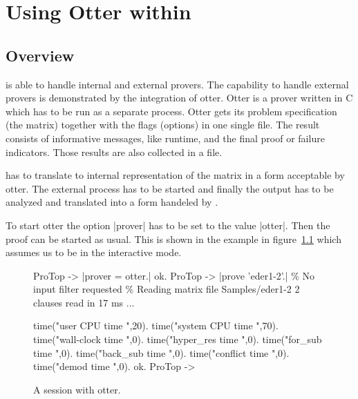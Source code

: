 
\chapter{Using Otter within \ProTop}


\section{Overview}

\ProTop{} is able to handle internal and external provers. The capability to
handle external provers is demonstrated by the integration of otter. Otter is
a prover written in C which has to be run as a separate process. Otter gets
its problem specification (the matrix) together with the flags (options) in
one single file. The result consists of informative messages, like runtime,
and the final proof or failure indicators. Those results are also collected in
a file.

\ProTop{} has to translate to internal representation of the matrix in a form
acceptable by otter. The external process has to be started and finally the
output has to be analyzed and translated into a form handeled by \ProTop.

To start otter the option |prover| has to be set to the value |otter|. Then
the proof can be started as usual. This is shown in the example in
figure~\ref{fig:otter} which assumes us to be in the \ProTop{} interactive
mode.

\begin{figure}[ht]
\begin{BoxedSample}
  ProTop -> |prover = otter.|
  ok.
  ProTop -> |prove 'eder1-2'.|
  \% No input filter requested
  \% Reading matrix file Samples/eder1-2
  2 clauses read in 17 ms 
  ...

  time("user CPU time       ",20).
  time("system CPU time     ",70).
  time("wall-clock time     ",0).
  time("hyper\_res time      ",0).
  time("for\_sub time        ",0).
  time("back\_sub time       ",0).
  time("conflict time       ",0).
  time("demod time          ",0).
  ok.
  ProTop -> 
\end{BoxedSample}
\caption{A session with otter.}\label{fig:otter}
\end{figure}



